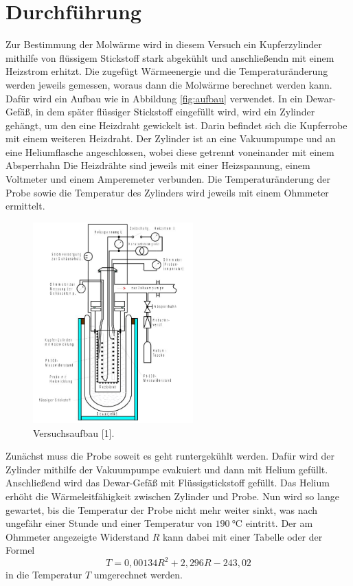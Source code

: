 \section{Durchführung}
\label{sec:Durchführung}
Zur Bestimmung der Molwärme wird in diesem Versuch ein Kupferzylinder mithilfe 
von flüssigem Stickstoff stark abgekühlt und anschließendn mit einem Heizstrom erhitzt. 
Die zugefügt Wärmeenergie und die Temperaturänderung werden jeweils gemessen, 
woraus dann die Molwärme berechnet werden kann. 
\\

Dafür wird ein Aufbau wie in Abbildung \ref{fig:aufbau} verwendet. 
In ein Dewar-Gefäß, in dem später flüssiger Stickstoff eingefüllt wird,
wird ein Zylinder gehängt, um den eine Heizdraht gewickelt ist. 
Darin befindet sich die Kupferrobe mit einem weiteren Heizdraht. 
Der Zylinder ist an eine Vakuumpumpe und an eine Heliumflasche angeschlossen, wobei diese 
getrennt voneinander mit einem Absperrhahn %
Die Heizdrähte sind jeweils mit einer Heizspannung, einem Voltmeter und einem Amperemeter
verbunden. Die Temperaturänderung der Probe sowie die Temperatur des Zylinders wird jeweils mit einem Ohmmeter ermittelt.
\FloatBarrier
\begin{figure}
  \centering
  \includegraphics[width=0.55\textwidth]{Aufbau.JPG}
  \caption{Versuchsaufbau [1].}
  \label{fig:hkurve}
\end{figure}
\FloatBarrier

Zunächst muss die Probe soweit es geht runtergekühlt werden. Dafür wird der Zylinder mithilfe der Vakuumpumpe evakuiert und dann 
mit Helium gefüllt. Anschließend wird das Dewar-Gefäß mit Flüssigstickstoff gefüllt. Das Helium erhöht die Wärmeleitfähigkeit 
zwischen Zylinder und Probe. Nun wird so lange gewartet, bis die Temperatur der Probe nicht mehr weiter sinkt, 
was nach ungefähr einer Stunde und einer Temperatur von $\SI{190}{\celsius}$ eintritt. 
Der am Ohmmeter angezeigte Widerstand $R$ kann dabei mit einer Tabelle oder der Formel 
\begin{equation}
    \label{eqn:T}
    T = 0,00134 R^2 + 2,296 R -243,02
\end{equation}
in die Temperatur $T$ umgerechnet werden.
\\

